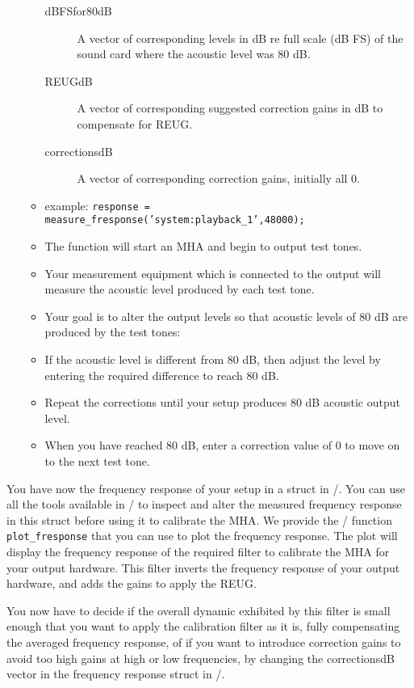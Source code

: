 \documentclass[11pt,a4paper,twoside]{article}
\newcommand{\+}{\discretionary{\mbox{\scriptsize$\hookleftarrow$}}{}{}}
\begin{document}
\begin{itemize}
\begin{itemize}
\begin{description}
    \item [dBFSfor80dB] A vector of corresponding levels in dB re full scale (dB FS) of the sound card where the acoustic level was 80 dB.
    \item [REUGdB] A vector of corresponding suggested correction gains in dB to compensate for REUG.
    \item [correctionsdB] A vector of corresponding correction gains, initially all 0.
    \end{description}
  \item
    example: \texttt{response = measure\_fresponse('system:playback\_1',48000);}
  \item
    The function will start an MHA and begin to output test tones.
  \item
    Your measurement equipment which is connected to the output will
    measure the acoustic level produced by each test tone.
  \item
    Your goal is to alter the output levels so that acoustic levels of
    80 dB are produced by the test tones:
  \item
    If the acoustic level is different from 80 dB, then adjust the level
    by entering the required difference to reach 80 dB.
  \item
    Repeat the corrections until your setup produces 80 dB acoustic
    output level.
  \item
    When you have reached 80 dB, enter a correction value of 0 to move
    on to the next test tone.
  \end{itemize}
\end{itemize}
  
You have now the frequency response of your setup in a struct in
\Octave{}/\Matlab{}.
%
You can use all the tools available in \Octave{}/\Matlab{} to inspect
and alter the measured frequency response in this struct before using
it to calibrate the MHA.
%
We provide the \Octave{}/\Matlab{} function \texttt{plot\_fresponse}
that you can use to plot the frequency response.
%
The plot will display the frequency response of the required filter to
calibrate the MHA for your output hardware.
%
This filter inverts the frequency response of your output hardware, and
adds the gains to apply the REUG.

You now have to decide if the overall dynamic exhibited by this filter
is small enough that you want to apply the calibration filter as it
is, fully compensating the averaged frequency response, of if you want
to introduce correction gains to avoid too high gains at high or low
frequencies, by changing the correctionsdB vector in the frequency
response struct in \Octave{}/\Matlab{}.
\end{document}
